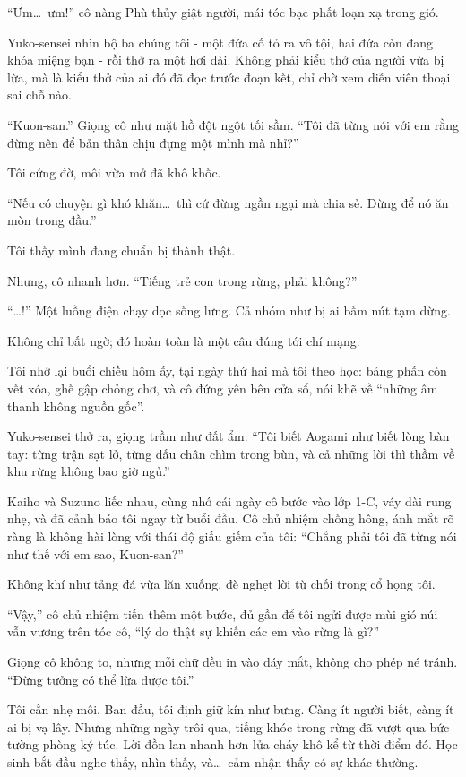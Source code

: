 \documentclass[../main.tex]{subfiles}
\begin{document}
``Ưm\dots\ ưm!'' cô nàng Phù thủy giật người, mái tóc bạc phất loạn xạ trong gió.

Yuko-sensei nhìn bộ ba chúng tôi - một đứa cố tỏ ra vô tội, hai đứa còn đang khóa miệng bạn - rồi thở ra một hơi dài. Không phải kiểu thở của người vừa bị lừa, mà là kiểu thở của ai đó đã đọc trước đoạn kết, chỉ chờ xem diễn viên thoại sai chỗ nào.

``Kuon-san.'' Giọng cô như mặt hồ đột ngột tối sầm. ``Tôi đã từng nói với em rằng đừng nên để bản thân chịu đựng một mình mà nhỉ?''

Tôi cứng đờ, môi vừa mở đã khô khốc.

``Nếu có chuyện gì khó khăn\dots\ thì cứ đừng ngần ngại mà chia sẻ. Đừng để nó ăn mòn trong đầu.''

Tôi thấy mình đang chuẩn bị thành thật.

Nhưng, cô nhanh hơn. ``Tiếng trẻ con trong rừng, phải không?''

``\dots!'' Một luồng điện chạy dọc sống lưng. Cả nhóm như bị ai bấm nút tạm dừng.

Không chỉ bất ngờ; đó hoàn toàn là một câu đúng tới chí mạng.

Tôi nhớ lại buổi chiều hôm ấy, tại ngày thứ hai mà tôi theo học: bảng phấn còn vết xóa, ghế gập chỏng chơ, và cô đứng yên bên cửa sổ, nói khẽ về ``những âm thanh không nguồn gốc''.

Yuko-sensei thở ra, giọng trầm như đất ẩm: ``Tôi biết Aogami như biết lòng bàn tay: từng trận sạt lở, từng dấu chân chìm trong bùn, và cả những lời thì thầm về khu rừng không bao giờ ngủ.''

Kaiho và Suzuno liếc nhau, cùng nhớ cái ngày cô bước vào lớp 1-C, váy dài rung nhẹ, và đã cảnh báo tôi ngay từ buổi đầu. Cô chủ nhiệm chống hông, ánh mắt rõ ràng là không hài lòng với thái độ giấu giếm của tôi: ``Chẳng phải tôi đã từng nói như thế với em sao, Kuon-san?''

Không khí như tảng đá vừa lăn xuống, đè nghẹt lời từ chối trong cổ họng tôi.

``Vậy,'' cô chủ nhiệm tiến thêm một bước, đủ gần để tôi ngửi được mùi gió núi vẫn vương trên tóc cô, ``lý do thật sự khiến các em vào rừng là gì?''

Giọng cô không to, nhưng mỗi chữ đều in vào đáy mắt, không cho phép né tránh.  ``Đừng tưởng có thể lừa được tôi.''

Tôi cắn nhẹ môi. Ban đầu, tôi định giữ kín như bưng. Càng ít người biết, càng ít ai bị vạ lây.
Nhưng những ngày trôi qua, tiếng khóc trong rừng đã vượt qua bức tường phòng ký túc. Lời đồn lan nhanh hơn lửa cháy khô kể từ thời điểm đó. Học sinh bắt đầu nghe thấy, nhìn thấy, và\dots\ cảm nhận thấy có sự khác thường.
\end{document}
